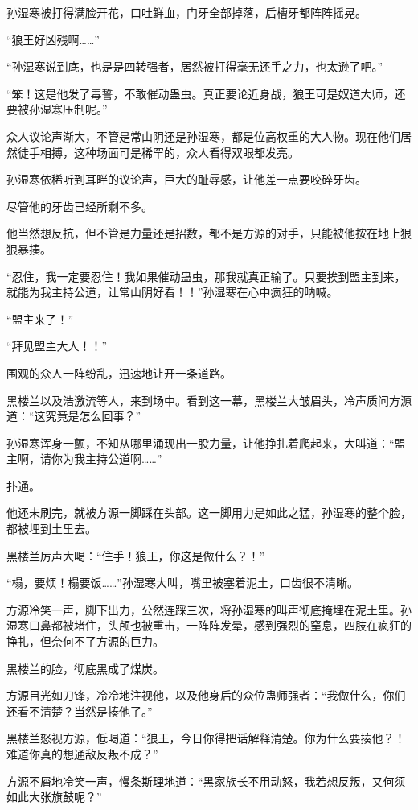 \begin{this_body}
孙湿寒被打得满脸开花，口吐鲜血，门牙全部掉落，后槽牙都阵阵摇晃。

“狼王好凶残啊……”

“孙湿寒说到底，也是是四转强者，居然被打得毫无还手之力，也太逊了吧。”

“笨！这是他发了毒誓，不敢催动蛊虫。真正要论近身战，狼王可是奴道大师，还要被孙湿寒压制呢。”

众人议论声渐大，不管是常山阴还是孙湿寒，都是位高权重的大人物。现在他们居然徒手相搏，这种场面可是稀罕的，众人看得双眼都发亮。

孙湿寒依稀听到耳畔的议论声，巨大的耻辱感，让他差一点要咬碎牙齿。

尽管他的牙齿已经所剩不多。

他当然想反抗，但不管是力量还是招数，都不是方源的对手，只能被他按在地上狠狠暴揍。

“忍住，我一定要忍住！我如果催动蛊虫，那我就真正输了。只要挨到盟主到来，就能为我主持公道，让常山阴好看！！”孙湿寒在心中疯狂的呐喊。

“盟主来了！”

“拜见盟主大人！！”

围观的众人一阵纷乱，迅速地让开一条道路。

黑楼兰以及浩激流等人，来到场中。看到这一幕，黑楼兰大皱眉头，冷声质问方源道：“这究竟是怎么回事？”

孙湿寒浑身一颤，不知从哪里涌现出一股力量，让他挣扎着爬起来，大叫道：“盟主啊，请你为我主持公道啊……”

扑通。

他还未刷完，就被方源一脚踩在头部。这一脚用力是如此之猛，孙湿寒的整个脸，都被埋到土里去。

黑楼兰厉声大喝：“住手！狼王，你这是做什么？！”

“榻，要烦！榻要饭……”孙湿寒大叫，嘴里被塞着泥土，口齿很不清晰。

方源冷笑一声，脚下出力，公然连踩三次，将孙湿寒的叫声彻底掩埋在泥土里。孙湿寒口鼻都被堵住，头颅也被重击，一阵阵发晕，感到强烈的窒息，四肢在疯狂的挣扎，但奈何不了方源的巨力。

黑楼兰的脸，彻底黑成了煤炭。

方源目光如刀锋，冷冷地注视他，以及他身后的众位蛊师强者：“我做什么，你们还看不清楚？当然是揍他了。”

黑楼兰怒视方源，低喝道：“狼王，今日你得把话解释清楚。你为什么要揍他？！难道你真的想通敌反叛不成？”

方源不屑地冷笑一声，慢条斯理地道：“黑家族长不用动怒，我若想反叛，又何须如此大张旗鼓呢？”


\end{this_body}
